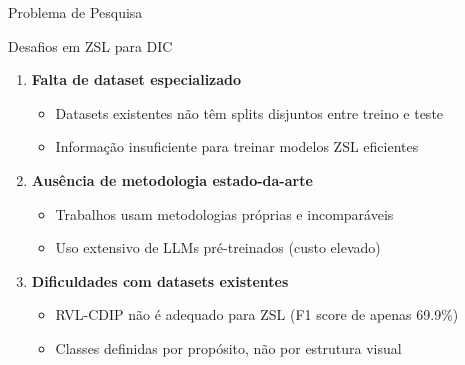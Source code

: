 \begin{frame}{Problema de Pesquisa}
\begin{block}{Desafios em ZSL para DIC}
\begin{enumerate}
    \item \textbf{Falta de dataset especializado}
    \begin{itemize}
        \item Datasets existentes não têm splits disjuntos entre treino e teste
        \item Informação insuficiente para treinar modelos ZSL eficientes
    \end{itemize}
    
    \item \textbf{Ausência de metodologia estado-da-arte}
    \begin{itemize}
        \item Trabalhos usam metodologias próprias e incomparáveis
        \item Uso extensivo de LLMs pré-treinados (custo elevado)
    \end{itemize}
    
    \item \textbf{Dificuldades com datasets existentes}
    \begin{itemize}
        \item RVL-CDIP não é adequado para ZSL (F1 score de apenas 69.9\%)
        \item Classes definidas por propósito, não por estrutura visual
    \end{itemize}
\end{enumerate}
\end{block}
\end{frame}

